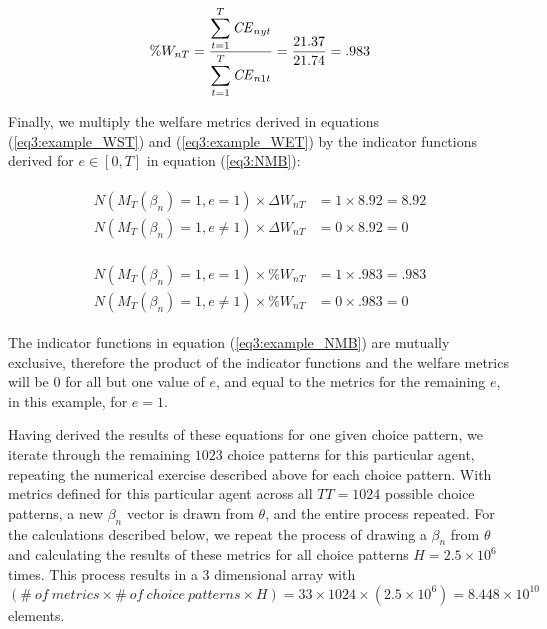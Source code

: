 \documentclass[../main.tex]{subfiles}
\begin{document}
\begin{equation}
	\label{eq3:example_WET}
	\%W_{nT} = \frac{\displaystyle\sum_{t=1}^{T} {\mathit{CE}}_{nyt} }{\displaystyle\sum_{t=1}^{T} {\mathit{CE}}_{n1t}} = \frac{21.37}{21.74} = .983
\end{equation}

\noindent Finally, we multiply the welfare metrics derived in equations (\ref{eq3:example_WST}) and (\ref{eq3:example_WET}) by the indicator functions derived for $e \in [0,T]$ in equation (\ref{eq3:NMB}):

\begin{align}
	\label{eq3:example_NMBWST}
	\begin{split}
		N( M_T(\beta_n) = 1, e = 1 )  \times \Delta W_{nT} &= 1 \times 8.92 = 8.92\\
		N( M_T(\beta_n) = 1, e \neq 1 )  \times \Delta W_{nT} &= 0 \times 8.92 = 0
	\end{split}
\end{align}

\begin{align}
	\label{eq3:example_NMBWET}
	\begin{split}
		N( M_T(\beta_n) = 1, e = 1 )  \times \%W_{nT} &= 1 \times .983 = .983\\
		N( M_T(\beta_n) = 1, e \neq 1 )  \times \%W_{nT} &= 0 \times .983 = 0
	\end{split}
\end{align}

\noindent The indicator functions in equation (\ref{eq3:example_NMB}) are mutually exclusive, therefore the product of the indicator functions and the welfare metrics will be $0$ for all but one value of $e$, and equal to the metrics for the remaining $e$, in this example, for $e = 1$. 

Having derived the results of these equations for one given choice pattern, we iterate through the remaining $1023$ choice patterns for this particular agent, repeating the numerical exercise described above for each choice pattern.
With metrics defined for this particular agent across all $TT = 1024$ possible choice patterns, a new $\beta_n$ vector is drawn from $\theta$, and the entire process repeated.
For the calculations described below, we repeat the process of drawing a $\beta_n$ from $\theta$ and calculating the results of these metrics for all choice patterns $H = 2.5 \times 10^6$ times.{\footnotemark}
This process results in a $3$ dimensional array with $(\mathit{\#\ of\ metrics} \times \mathit{\#\ of\ choice\ patterns} \times H) = 33 \times 1024 \times (2.5 \times 10^6) = 8.448 \times 10^{10}$ elements.
\end{document}
